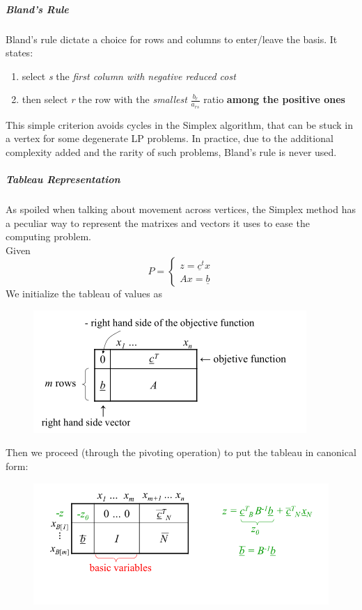 \documentclass{article}
\begin{document}
					\subparagraph{Bland's Rule}
						Bland's rule dictate a choice for rows and columns to enter/leave the basis. It states:
						\begin{enumerate}
							\item select \emph{s} the \textit{first column with negative reduced cost}
							\item then select \emph{r} the row with the \textit{smallest} $\frac{b_r}{a_{rs}}$ ratio \textbf{among the positive ones}
						\end{enumerate}
						This simple criterion avoids cycles in the Simplex algorithm, that can be stuck in a vertex for some degenerate LP problems. In practice, due to the additional complexity added and the rarity of such problems, Bland's rule is never used.

					\subparagraph{Tableau Representation}
						As spoiled when talking about movement across vertices, the Simplex method has a peculiar way to represent the matrixes and vectors it uses to ease the computing problem.\\
						Given
						\begin{equation}
							P = 
							\begin{cases}
								z=\underline{c}^t x\\
								Ax = \underline{b}
							\end{cases}
						\end{equation}
						We initialize the tableau of values as
						\begin{figure}[H]
							\centering
							\includegraphics[width = \textwidth]{./images/Simplex2.png}
						\end{figure}
						Then we proceed (through the pivoting operation) to put the tableau in canonical form:
						\begin{figure}[H]
							\centering
							\includegraphics[width = \textwidth]{./images/Simplex3.png}
						\end{figure}
\end{document}
